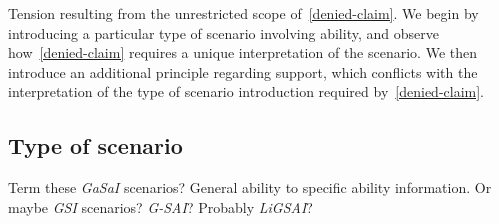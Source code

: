 \begin{note}[Overview]
  Tension resulting from the unrestricted scope of~\ref{denied-claim}.
  We begin by introducing a particular type of scenario involving ability, and observe how~\ref{denied-claim} requires a unique interpretation of the scenario.
  We then introduce an additional principle regarding support, which conflicts with the interpretation of the type of scenario introduction required by~\ref{denied-claim}.
\end{note}

\subsection{Type of scenario}
\label{sec:type-scenario}

{
  \color{red}
  Term these \emph{GaSaI} scenarios?
  General ability to specific ability information.
  Or maybe \emph{GSI} scenarios?
  \emph{G-SAI}?
  Probably \emph{LiGSAI}?
}

